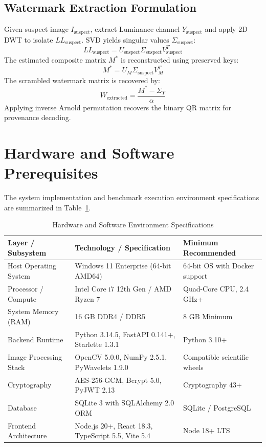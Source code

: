 \documentclass[12pt,a4paper]{report}
\begin{document}
\subsection{Watermark Extraction Formulation}
Given suspect image $I_{\text{suspect}}$, extract Luminance channel $Y_{\text{suspect}}$ and apply 2D DWT to isolate $LL_{\text{suspect}}$. SVD yields singular values $\Sigma_{\text{suspect}}$:
\begin{equation}
    LL_{\text{suspect}} = U_{\text{suspect}} \Sigma_{\text{suspect}} V_{\text{suspect}}^T
\end{equation}
The estimated composite matrix $M^*$ is reconstructed using preserved keys:
\begin{equation}
    M^* = U_M \Sigma_{\text{suspect}} V_M^T
\end{equation}
The scrambled watermark matrix is recovered by:
\begin{equation}
    W_{\text{extracted}} = \frac{M^* - \Sigma_Y}{\alpha}
\end{equation}
Applying inverse Arnold permutation recovers the binary QR matrix for provenance decoding.

\section{Hardware and Software Prerequisites}
The system implementation and benchmark execution environment specifications are summarized in Table~\ref{tab:env_specs}.

\begin{table}[htbp]
\centering
\small
\caption{Hardware and Software Environment Specifications}
\label{tab:env_specs}
\begin{tabularx}{\textwidth}{p{4.0cm}p{6.0cm}X}
\toprule
\textbf{Layer / Subsystem} & \textbf{Technology / Specification} & \textbf{Minimum Recommended} \\
\midrule
Host Operating System & Windows 11 Enterprise (64-bit AMD64) & 64-bit OS with Docker support \\
Processor / Compute & Intel Core i7 12th Gen / AMD Ryzen 7 & Quad-Core CPU, 2.4 GHz+ \\
System Memory (RAM) & 16 GB DDR4 / DDR5 & 8 GB Minimum \\
Backend Runtime & Python 3.14.5, FastAPI 0.141+, Starlette 1.3.1 & Python 3.10+ \\
Image Processing Stack & OpenCV 5.0.0, NumPy 2.5.1, PyWavelets 1.9.0 & Compatible scientific wheels \\
Cryptography & AES-256-GCM, Bcrypt 5.0, PyJWT 2.13 & Cryptography 43+ \\
Database & SQLite 3 with SQLAlchemy 2.0 ORM & SQLite / PostgreSQL \\
Frontend Architecture & Node.js 20+, React 18.3, TypeScript 5.5, Vite 5.4 & Node 18+ LTS \\
\bottomrule
\end{tabularx}
\end{table}
\end{document}
